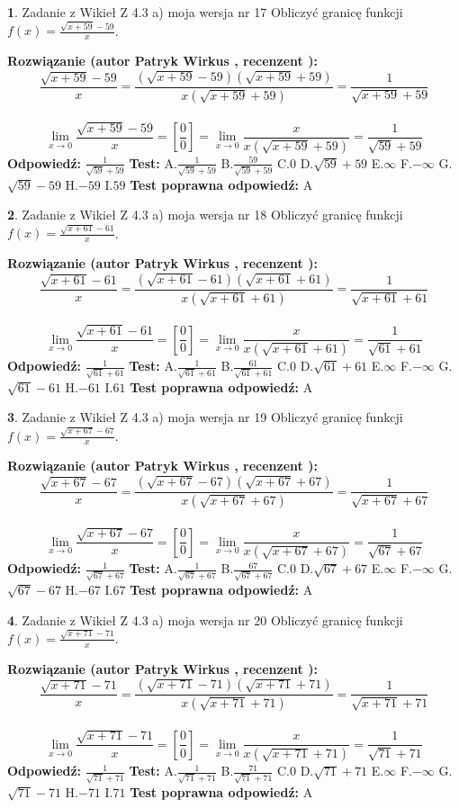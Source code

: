 \documentclass[12pt, a4paper]{article}
\theoremstyle{definition} %
\newtheorem{zad}{}
\newcommand{\zadStart}[1]{\begin{zad}#1\newline}
\newcommand{\zadStop}{\end{zad}}
\newcommand{\rozwStart}[2]{\noindent \textbf{Rozwiązanie (autor #1 , recenzent #2): }\newline}
\newcommand{\rozwStop}{\newline}
\newcommand{\odpStart}{\noindent \textbf{Odpowiedź:}\newline}
\newcommand{\odpStop}{\newline}
\newcommand{\testStart}{\noindent \textbf{Test:}\newline}
\newcommand{\testStop}{\newline}
\newcommand{\kluczStart}{\noindent \textbf{Test poprawna odpowiedź:}\newline}
\newcommand{\kluczStop}{\newline}
\begin{document}
\zadStart{Zadanie z Wikieł Z 4.3 a) moja wersja nr 17}
Obliczyć granicę funkcji $f(x)=\frac{\sqrt{x+59}-59}{x}$.
\zadStop
\rozwStart{Patryk Wirkus}{}
$$\frac{\sqrt{x+59}-59}{x}=\frac{(\sqrt{x+59}-59)(\sqrt{x+59}+59)}{x(\sqrt{x+59}+59)}=\frac{1}{\sqrt{x+59}+59}$$
\\
$$\lim\limits_{x\to0}\frac{\sqrt{x+59}-59}{x}=[\frac{0}{0}]=
\lim\limits_{x\to0}\frac{x}{x(\sqrt{x+59}+59)} = \frac{1}{\sqrt{59}+59}$$
\rozwStop
\odpStart
$\frac{1}{\sqrt{59}+59}$
\odpStop
\testStart
A.$\frac{1}{\sqrt{59}+59}$
B.$\frac{59}{\sqrt{59}+59}$
C.$0$
D.$\sqrt{59}+59$
E.$\infty$
F.$-\infty$
G.$\sqrt{59}-59$
H.$-59$
I.$59$
\testStop
\kluczStart
A
\kluczStop



\zadStart{Zadanie z Wikieł Z 4.3 a) moja wersja nr 18}
Obliczyć granicę funkcji $f(x)=\frac{\sqrt{x+61}-61}{x}$.
\zadStop
\rozwStart{Patryk Wirkus}{}
$$\frac{\sqrt{x+61}-61}{x}=\frac{(\sqrt{x+61}-61)(\sqrt{x+61}+61)}{x(\sqrt{x+61}+61)}=\frac{1}{\sqrt{x+61}+61}$$
\\
$$\lim\limits_{x\to0}\frac{\sqrt{x+61}-61}{x}=[\frac{0}{0}]=
\lim\limits_{x\to0}\frac{x}{x(\sqrt{x+61}+61)} = \frac{1}{\sqrt{61}+61}$$
\rozwStop
\odpStart
$\frac{1}{\sqrt{61}+61}$
\odpStop
\testStart
A.$\frac{1}{\sqrt{61}+61}$
B.$\frac{61}{\sqrt{61}+61}$
C.$0$
D.$\sqrt{61}+61$
E.$\infty$
F.$-\infty$
G.$\sqrt{61}-61$
H.$-61$
I.$61$
\testStop
\kluczStart
A
\kluczStop



\zadStart{Zadanie z Wikieł Z 4.3 a) moja wersja nr 19}
Obliczyć granicę funkcji $f(x)=\frac{\sqrt{x+67}-67}{x}$.
\zadStop
\rozwStart{Patryk Wirkus}{}
$$\frac{\sqrt{x+67}-67}{x}=\frac{(\sqrt{x+67}-67)(\sqrt{x+67}+67)}{x(\sqrt{x+67}+67)}=\frac{1}{\sqrt{x+67}+67}$$
\\
$$\lim\limits_{x\to0}\frac{\sqrt{x+67}-67}{x}=[\frac{0}{0}]=
\lim\limits_{x\to0}\frac{x}{x(\sqrt{x+67}+67)} = \frac{1}{\sqrt{67}+67}$$
\rozwStop
\odpStart
$\frac{1}{\sqrt{67}+67}$
\odpStop
\testStart
A.$\frac{1}{\sqrt{67}+67}$
B.$\frac{67}{\sqrt{67}+67}$
C.$0$
D.$\sqrt{67}+67$
E.$\infty$
F.$-\infty$
G.$\sqrt{67}-67$
H.$-67$
I.$67$
\testStop
\kluczStart
A
\kluczStop



\zadStart{Zadanie z Wikieł Z 4.3 a) moja wersja nr 20}
Obliczyć granicę funkcji $f(x)=\frac{\sqrt{x+71}-71}{x}$.
\zadStop
\rozwStart{Patryk Wirkus}{}
$$\frac{\sqrt{x+71}-71}{x}=\frac{(\sqrt{x+71}-71)(\sqrt{x+71}+71)}{x(\sqrt{x+71}+71)}=\frac{1}{\sqrt{x+71}+71}$$
\\
$$\lim\limits_{x\to0}\frac{\sqrt{x+71}-71}{x}=[\frac{0}{0}]=
\lim\limits_{x\to0}\frac{x}{x(\sqrt{x+71}+71)} = \frac{1}{\sqrt{71}+71}$$
\rozwStop
\odpStart
$\frac{1}{\sqrt{71}+71}$
\odpStop
\testStart
A.$\frac{1}{\sqrt{71}+71}$
B.$\frac{71}{\sqrt{71}+71}$
C.$0$
D.$\sqrt{71}+71$
E.$\infty$
F.$-\infty$
G.$\sqrt{71}-71$
H.$-71$
I.$71$
\testStop
\kluczStart
A
\kluczStop
\end{document}
